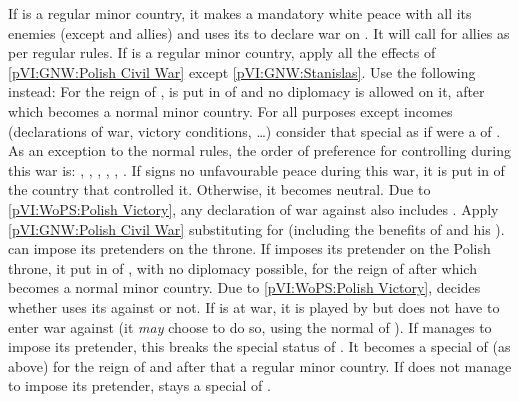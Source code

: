 \begin{digressions}


  \phdipl
  \aparag If \payspologne is a regular minor country, it makes a mandatory
  white peace with all its enemies (except \SUE and allies) and uses its \CB
  to declare war on \SUE. It will call for allies as per regular rules.
  \aparag If \payspologne is a regular minor country, apply all the effects of
  \ref{pVI:GNW:Polish Civil War} except \ref{pVI:GNW:Stanislas}. Use the
  following instead: For the reign of \monarqueStanislas, \payspologne is put
  in \EG of \SUE and no diplomacy is allowed on it, after which \payspologne
  becomes a normal minor country.
  \bparag For all purposes except incomes (declarations of war, victory
  conditions, \ldots) consider that special \EG as if \payspologne were a
  \VASSAL of \SUE.
  \bparag As an exception to the normal rules, the order of preference for
  controlling \payspologne during this war is: \PRU, \FRA, \AUS, \HOL, \ENG,
  \RUS.
  \bparag If \payspologne signs no unfavourable peace during this war, it is
  put in \EG of the country that controlled it. Otherwise, it becomes neutral.
   Due to \ref{pVI:WoPS:Polish
    Victory}, any declaration of war against \SUE also includes
  \payspologne. Apply \ref{pVI:GNW:Polish Civil War} substituting \RUS for
  \SUE (including the benefits of \leaderPoniatowski and his \ARMY). \RUS can
  impose its pretenders on the throne.
  \bparag If \RUS imposes its pretender on the Polish throne, \payspologne it
  put in \EG of \RUS, with no diplomacy possible, for the reign of
  \monarqueStanislas after which \payspologne becomes a normal minor country.
   Due to \ref{pVI:WoPS:Polish
    Victory}, \FRA decides whether \payspologne uses its \CB against \SUE or
  not.
  \bparag If \payspologne is at war, it is played by \FRA
  but \FRA does not have to enter war against \SUE (it \emph{may} choose to do
  so, using the normal \CB of \POL).
  \bparag If \SUE manages to impose its pretender, this breaks the special
  status of \payspologne. It becomes a special \EG of \SUE (as above) for the
  reign of \monarqueStanislas and after that a regular minor country.
  \bparag If \SUE does not manage to impose its pretender, \payspologne stays
  a special \EG of \FRA.

\end{digressions}



